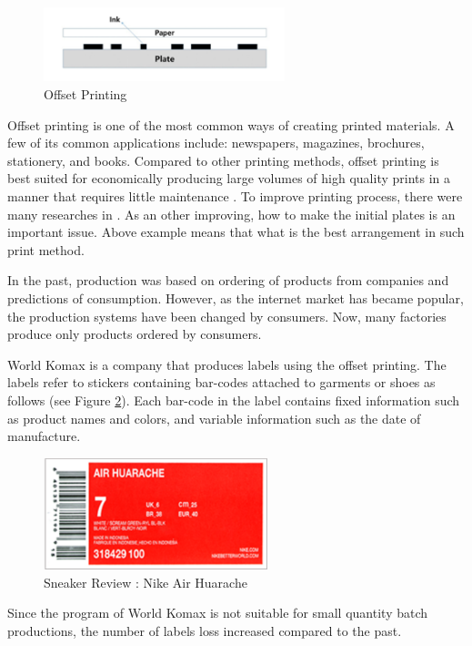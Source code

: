 \documentclass[a4paper]{amsart}
\numberwithin{equation}{section} %
\numberwithin{figure}{section} %
\numberwithin{table}{section}
\theoremstyle{plain}
\theoremstyle{definition}
\theoremstyle{plain}
\theoremstyle{plain}
\theoremstyle{plain}
\theoremstyle{plain}
\theoremstyle{plain}
\begin{document}
\begin{figure}[h!]
	\centering
	\includegraphics[width=7cm]{OffsetPrint.pdf}
	\caption{Offset Printing}
	\label{fig:OffsetPrint}
\end{figure}

Offset printing is one of the most common ways of creating printed materials. A few of its common applications include: newspapers, magazines, brochures, stationery, and books. Compared to other printing methods, offset printing is best suited for economically producing large volumes of high quality prints in a manner that requires little maintenance \cite{Kipphan2001}. 
To improve printing process, there were many researches in \cite{AlChan, Muscle, Carmo}.
As an other improving, how to make the initial plates is an important issue. Above example means that what is the best arrangement in such print method.

In the past, production was based on ordering of products from companies and predictions of consumption. 
However, as the internet market has became popular, the production systems have been changed by consumers. 
Now, many factories produce only products ordered by consumers.

World Komax is a company that produces labels using the offset printing. The labels refer to stickers containing bar-codes attached to garments or shoes as follows (see Figure \ref{fig:AirHuarache}). Each bar-code in the label contains fixed information such as product names and colors, and variable information such as the date of manufacture.

\begin{figure}[h!]
	\centering
	\includegraphics[width=6.5cm]{AirHuarache.pdf}
	\caption{Sneaker Review : Nike Air Huarache}
	\label{fig:AirHuarache}       %
\end{figure}

\noindent
Since the program of World Komax is not suitable for small quantity batch productions, the number of labels loss increased compared to the past.
\end{document}
